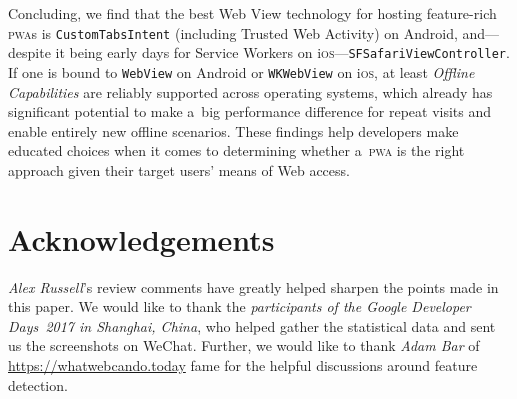 \documentclass[sigconf,hyphens]{acmart}
\begin{document}
Concluding, we find that the best Web View technology for hosting feature-rich
\textsc{pwa}s is \texttt{CustomTabsIntent} (including Trusted Web Activity) on Android,
and---despite it being early days for Service Workers on i\textsc{os}---\texttt{SFSafariViewController}.
If one is bound to \texttt{WebView} on Android or \texttt{WKWebView} on i\textsc{os},
at least \emph{Offline Capabilities} are reliably supported across operating systems,
which already has significant potential to make a~big performance difference
for repeat visits and enable entirely new offline scenarios.
These findings help developers make educated choices
when it comes to determining whether a~\textsc{pwa} is the right approach
given their target users' means of Web access.

\section*{Acknowledgements}

\emph{Alex Russell}'s review comments have greatly helped sharpen the points made in this paper.
We would like to thank the \emph{participants of the Google Developer Days~2017 in Shanghai, China},
who helped gather the statistical data and sent us
the screenshots on WeChat.
Further, we would like to thank \emph{Adam Bar} of \url{https://whatwebcando.today} fame
for the helpful discussions around feature detection.



\end{document}
